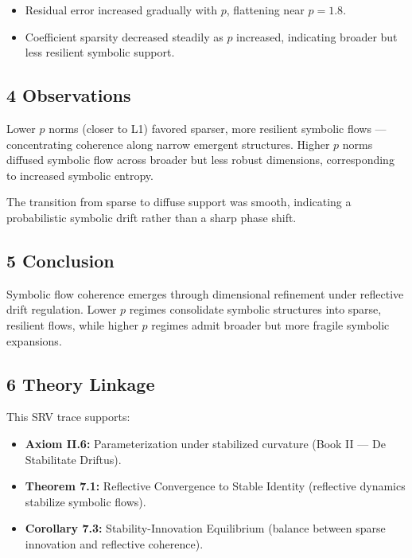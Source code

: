 \begin{itemize}
    \item Residual error increased gradually with $p$, flattening near $p = 1.8$.
    \item Coefficient sparsity decreased steadily as $p$ increased, indicating broader but less resilient symbolic support.
\end{itemize}

\subsection*{4 Observations}
\label{subsection:trace4_observations}

Lower $p$ norms (closer to L1) favored sparser, more resilient symbolic flows — concentrating coherence along narrow emergent structures. Higher $p$ norms diffused symbolic flow across broader but less robust dimensions, corresponding to increased symbolic entropy.

The transition from sparse to diffuse support was smooth, indicating a probabilistic symbolic drift rather than a sharp phase shift.

\subsection*{5 Conclusion}
\label{subsection:trace4_conclusion}

Symbolic flow coherence emerges through dimensional refinement under reflective drift regulation. Lower $p$ regimes consolidate symbolic structures into sparse, resilient flows, while higher $p$ regimes admit broader but more fragile symbolic expansions.

\subsection*{6 Theory Linkage}
\label{subsection:trace4_theory_linkage}

This SRV trace supports:
\begin{itemize}
    \item \textbf{Axiom II.6:} Parameterization under stabilized curvature (Book II — De Stabilitate Driftus).
    \item \textbf{Theorem 7.1:} Reflective Convergence to Stable Identity (reflective dynamics stabilize symbolic flows).
    \item \textbf{Corollary 7.3:} Stability-Innovation Equilibrium (balance between sparse innovation and reflective coherence).
\end{itemize}

